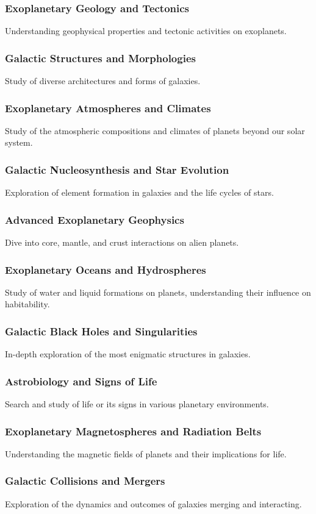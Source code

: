 \subsubsection{Exoplanetary Geology and Tectonics}
Understanding geophysical properties and tectonic activities on exoplanets.
\subsubsection{Galactic Structures and Morphologies}
Study of diverse architectures and forms of galaxies.
\subsubsection{Exoplanetary Atmospheres and Climates}
Study of the atmospheric compositions and climates of planets beyond our solar system.
\subsubsection{Galactic Nucleosynthesis and Star Evolution}
Exploration of element formation in galaxies and the life cycles of stars.
\subsubsection{Advanced Exoplanetary Geophysics}
Dive into core, mantle, and crust interactions on alien planets.
\subsubsection{Exoplanetary Oceans and Hydrospheres}
Study of water and liquid formations on planets, understanding their influence on habitability.
\subsubsection{Galactic Black Holes and Singularities}
In-depth exploration of the most enigmatic structures in galaxies.
\subsubsection{Astrobiology and Signs of Life}
Search and study of life or its signs in various planetary environments.
\subsubsection{Exoplanetary Magnetospheres and Radiation Belts}
Understanding the magnetic fields of planets and their implications for life.
\subsubsection{Galactic Collisions and Mergers}
Exploration of the dynamics and outcomes of galaxies merging and interacting.
